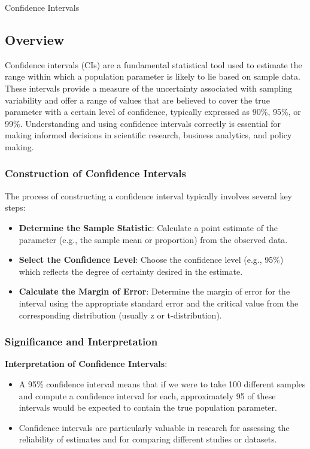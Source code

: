 \begin{notes}{Confidence Intervals}
    \subsection*{Overview}

    Confidence intervals (CIs) are a fundamental statistical tool used to estimate the range within which a population parameter is likely to lie based on sample data. These intervals provide a 
    measure of the uncertainty associated with sampling variability and offer a range of values that are believed to cover the true parameter with a certain level of confidence, typically expressed 
    as 90\%, 95\%, or 99\%. Understanding and using confidence intervals correctly is essential for making informed decisions in scientific research, business analytics, and policy making. \vspace*{1em}
    
    \subsubsection*{Construction of Confidence Intervals}
    
    The process of constructing a confidence interval typically involves several key steps:
    \begin{itemize}
        \item \textbf{Determine the Sample Statistic}: Calculate a point estimate of the parameter (e.g., the sample mean or proportion) from the observed data.
        \item \textbf{Select the Confidence Level}: Choose the confidence level (e.g., 95\%) which reflects the degree of certainty desired in the estimate.
        \item \textbf{Calculate the Margin of Error}: Determine the margin of error for the interval using the appropriate standard error and the critical value from the corresponding distribution (usually z or t-distribution).
    \end{itemize}
    
    \subsubsection*{Significance and Interpretation}
    
    \textbf{Interpretation of Confidence Intervals}:
    \begin{itemize}
        \item A 95\% confidence interval means that if we were to take 100 different samples and compute a confidence interval for each, approximately 95 of these intervals would be expected to contain the true population parameter.
        \item Confidence intervals are particularly valuable in research for assessing the reliability of estimates and for comparing different studies or datasets.
    \end{itemize}
    

\end{notes}
